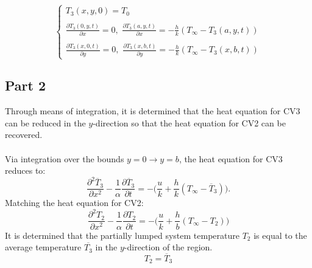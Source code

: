 \documentclass{article}
\newcommand{\dTdt}{\frac{\partial T_2}{\partial t}}
\newcommand{\dTdx}{\frac{\partial^2 T_2}{\partial x^2}}
\begin{document}
\begin{equation}
    \begin{cases}
    T_3(x,y,0) = T_0 \\
    \\
    \frac{\partial T_3(0,y,t)}{\partial x} = 0, \, \, \frac{\partial T_3(a,y,t)}{\partial x} = -\frac{h}{k}(T_\infty - T_3(a,y,t)) \\
    \\
    \frac{\partial T_3(x,0,t)}{\partial y} = 0, \, \, \frac{\partial T_3(x,b,t)}{\partial y} = -\frac{h}{k}(T_\infty - T_3(x,b,t))
    \end{cases}
    \label{BC3}
\end{equation}

\subsection*{Part 2}
Through means of integration, it is determined that the heat equation for CV3 can be reduced in the $y$-direction so that the heat equation for CV2 can be recovered.\\ \\Via integration over the bounds $y=0 \rightarrow y=b$, the heat equation for CV3 reduces to:
\begin{equation}
    \frac{\partial^2 \overline{T}_3}{\partial x^2} - \frac{1}{\alpha} \frac{\partial \overline{T}_3}{\partial t} = -\bigg(\frac{u}{k} + \frac{h}{k}(T_\infty - \overline{T}_3)\bigg).
    \label{meanT3}
\end{equation}
Matching the heat equation for CV2:
\begin{equation}
    \dTdx - \frac{1}{\alpha} \dTdt = -\bigg(\frac{u}{k} + \frac{h}{b}(T_\infty - T_2)\bigg)
    \label{T2}
\end{equation}
It is determined that the partially lumped system temperature $T_2$ is equal to the average temperature $\overline{T_3}$ in the $y$-direction of the region.
\begin{equation}
    T_2 = \overline{T}_3
\end{equation}
\end{document}
